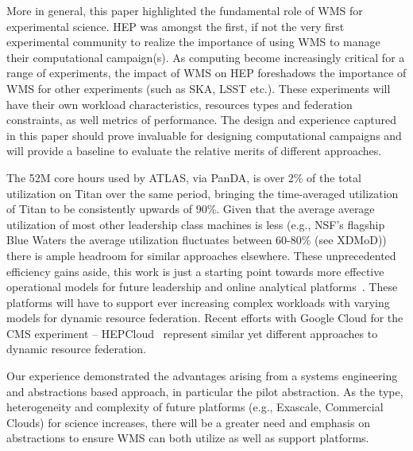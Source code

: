 More in general, this paper highlighted the fundamental role of WMS for
experimental science. HEP was amongst the first, if not the very first
experimental community to realize the importance of using WMS to manage their
computational campaign(s). As computing become increasingly critical for a range
of experiments, the impact of WMS on HEP foreshadows the importance of WMS for
other experiments (such as SKA, LSST etc.). %
These experiments will have their own workload characteristics, resources types
and federation constraints, as well metrics of performance.  The design and
experience captured in this paper should prove invaluable for designing
computational campaigns and will provide a baseline to evaluate the relative
merits of different approaches.

The 52M core hours used by ATLAS, via PanDA, is over 2\% of the total
utilization on Titan over the same period, bringing the time-averaged
utilization of Titan to be consistently upwards of 90\%. Given that the
average average utilization of most other leadership class machines is less
(e.g., NSF's flagship Blue Waters the average utilization fluctuates between
60-80\% (see XDMoD\cite{bw-sucks})) there is ample headroom for similar
approaches elsewhere. These unprecedented efficiency gains aside, this work is
just a starting point towards more effective operational models for future
leadership and online analytical platforms~\cite{foap-url}. These platforms
will have to support ever increasing complex workloads with varying models for
dynamic resource federation. Recent efforts with Google Cloud for the CMS
experiment -- HEPCloud~\cite{hepcloud,googlehep} represent similar yet
different approaches to dynamic resource federation.

Our experience demonstrated the advantages arising from a  systems engineering
and abstractions based approach, in particular the pilot abstraction. As the
type, heterogeneity and complexity of future platforms  (e.g., Exascale,
Commercial Clouds) for science increases, there will be a greater need and
emphasis on abstractions to ensure WMS can both utilize as well as support
platforms.
